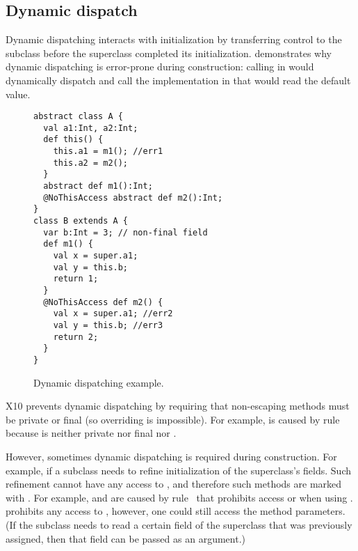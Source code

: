 \subsection{Dynamic dispatch}
Dynamic dispatching interacts with initialization by transferring control to the subclass
    before the superclass completed its initialization.
 demonstrates why dynamic dispatching is error-prone during construction:
    calling  in  would dynamically dispatch and
    call the implementation in 
    that would read the default value.



\begin{figure}
\begin{lstlisting}
abstract class A {
  val a1:Int, a2:Int;
  def this() {
    this.a1 = m1(); //err1
    this.a2 = m2();
  }
  abstract def m1():Int;
  @NoThisAccess abstract def m2():Int;
}
class B extends A {
  var b:Int = 3; // non-final field
  def m1() {
    val x = super.a1;
    val y = this.b;
    return 1;
  }
  @NoThisAccess def m2() {
    val x = super.a1; //err2
    val y = this.b; //err3
    return 2;
  }
}
\end{lstlisting}
\caption{Dynamic dispatching example.
    }
\label{Figure:Dynamic-dispatch}
\end{figure}


X10 prevents dynamic dispatching by requiring that non-escaping methods
    must be private or final
    (so overriding is impossible).
For example,  is caused by rule~
    because  is neither private nor final nor .

However, sometimes dynamic dispatching is required during construction.
For example, if a subclass needs to refine initialization
    of the superclass's fields.
Such refinement cannot have any access to \this, and therefore
    such methods are marked with .
For example,  and  are caused by rule~ that prohibits access \this or 
    when using .
 prohibits any access to \this,
    however, one could still access the method parameters.
(If the subclass needs to read a certain field of the superclass that was previously assigned,
    then that field can be passed as an argument.) %


